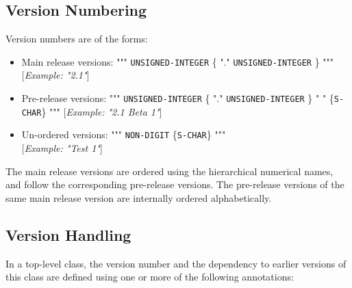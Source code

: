 \subsection{Version Numbering}

Version numbers are of the forms:

\begin{itemize}
\item
  Main release versions: """ \lstinline!UNSIGNED-INTEGER! \{ "." \lstinline!UNSIGNED-INTEGER! \}
  """ {[}\emph{Example: "2.1"}{]}
\item
  Pre-release versions: """ \lstinline!UNSIGNED-INTEGER! \{ "." \lstinline!UNSIGNED-INTEGER! \}
  " " \{\lstinline!S-CHAR!\} """ {[}\emph{Example: "2.1 Beta 1"}{]}
\item
  Un-ordered versions: """ \lstinline!NON-DIGIT! \{\lstinline!S-CHAR!\} """\\
  {[}\emph{Example: "Test 1"}{]}
\end{itemize}

The main release versions are ordered using the hierarchical numerical
names, and follow the corresponding pre-release versions. The
pre-release versions of the same main release version are internally
ordered alphabetically.

\subsection{Version Handling}

In a top-level class, the version number and the dependency to earlier
versions of this class are defined using one or more of the following
annotations:

